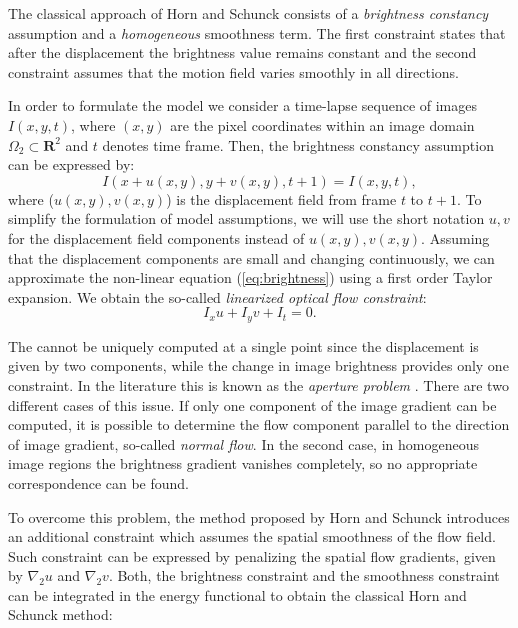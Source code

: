 The classical \opticalflow approach of Horn and Schunck consists of a \textit{brightness constancy} assumption and a \textit{homogeneous} smoothness term. The first constraint states that after the displacement the  brightness value remains constant and the second constraint assumes that the motion field varies smoothly in all directions.

In order to formulate the \opticalflow model we consider a time-lapse sequence of images $I(x,y,t)$, where $(x,y)$ are the pixel coordinates within an image domain $ \Omega_{2} \subset     \mathbf{R}^2$ and $t$ denotes time frame. Then, the brightness constancy assumption can be expressed by:
\begin{equation}
	I(x+u(x,y), y+v(x,y), t+1) = I(x,y,t),
	\label{eq:brightness}		
\end{equation}
where ($u(x,y),v(x,y)$) is the displacement field from frame $t$ to $t+1$. To simplify the formulation of model assumptions, we will use the short notation $u, v$ for the displacement field components  instead of $u(x,y),v(x,y)$.
Assuming that the displacement components are small and changing continuously, we can approximate the non-linear equation (\ref{eq:brightness})  using a first order Taylor expansion. We obtain the so-called \textit{ linearized optical flow constraint}:
\begin{equation}
	I_{x}u + I_{y}v +I_{t} = 0.
\end{equation}

The \opticalflow cannot be  uniquely computed at a single point since the displacement is given by two components, while the change in image brightness provides only one constraint. In the literature this is known as the \textit{aperture problem} \cite{Bertero88}. There are two different cases of this issue. If only one component of the image gradient can be computed, it is possible to determine the flow component parallel to the direction of image gradient, so-called \textit{normal flow}.
In the second case, in homogeneous image regions the brightness gradient vanishes completely, so no appropriate correspondence can be found. 

To overcome this problem, the method proposed by Horn and Schunck introduces an additional constraint which assumes the spatial smoothness of the flow field. Such constraint can be expressed by penalizing the spatial flow gradients, given by $\nabla_{2}u$ and $\nabla_{2}v$.
Both, the brightness constraint and the smoothness constraint can be integrated in the energy functional to obtain the classical Horn and Schunck method:

